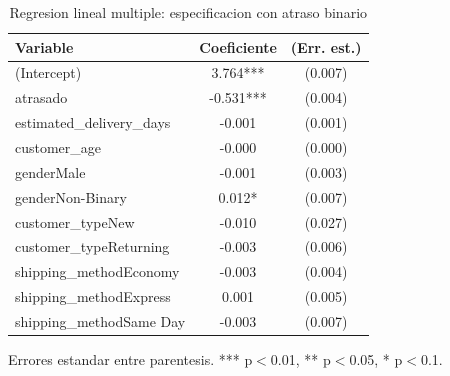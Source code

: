 \begin{table}[htbp]
\centering
\caption{Regresion lineal multiple: especificacion con atraso binario}
\label{tab:olsrob}
\begin{tabular}{lcc}
\toprule
Variable & Coeficiente & (Err. est.) \\
\midrule
(Intercept) & 3.764*** & (0.007) \\
atrasado & -0.531*** & (0.004) \\
estimated\_delivery\_days & -0.001 & (0.001) \\
customer\_age & -0.000 & (0.000) \\
genderMale & -0.001 & (0.003) \\
genderNon-Binary & 0.012* & (0.007) \\
customer\_typeNew & -0.010 & (0.027) \\
customer\_typeReturning & -0.003 & (0.006) \\
shipping\_methodEconomy & -0.003 & (0.004) \\
shipping\_methodExpress & 0.001 & (0.005) \\
shipping\_methodSame Day & -0.003 & (0.007) \\
\bottomrule
\end{tabular}
\begin{minipage}{0.9\textwidth}\footnotesize Errores estandar entre parentesis. *** p$<$0.01, ** p$<$0.05, * p$<$0.1. \end{minipage}
\end{table}
